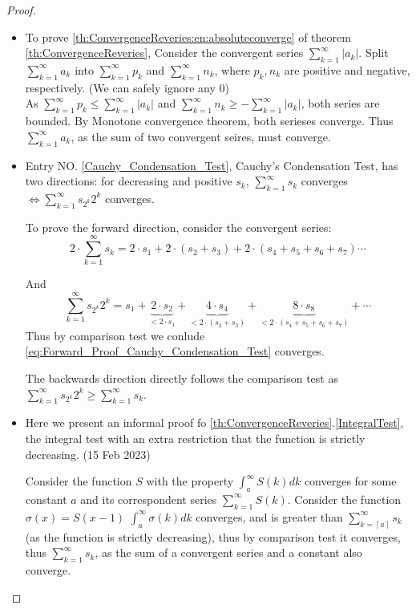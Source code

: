 \documentclass[../note.tex]{subfiles}
\begin{document}
\begin{proof}

\begin{itemize}
	\item 
	To prove \ref{th:ConvergenceReveries:en:absoluteconverge} of theorem \ref{th:ConvergenceReveries},
	Consider the convergent series $\sum^{\infty}_{k=1}|a_k|$.
	Split $\sum^{\infty}_{k=1}a_k$ into $\sum^{\infty}_{k=1}p_k$ and $\sum^{\infty}_{k=1}n_k$, where $p_k, n_k$ are positive and negative, respectively. (We can safely ignore any 0)\\
	As $\sum^{\infty}_{k=1}p_k \leq \sum^{\infty}_{k=1}|a_k| $ and $\sum^{\infty}_{k=1}n_k \geq -\sum^{\infty}_{k=1}|a_k|$, both series are bounded. By Monotone convergence theorem, both serieses converge.
	Thus $\sum^{\infty}_{k=1}a_k$, as the sum of two convergent seires, must converge.

	\item
	Entry NO. \ref{Cauchy_Condensation_Test}, Cauchy's Condensation Test, has two directions: for decreasing and positive $s_k$, $\sum^{\infty}_{k=1}s_k$ converges $\iff \sum^{\infty}_{k=1}s_{2^k}2^k$ converges.

	To prove the forward direction, consider the convergent series:
	\[
		2\cdot \sum^{\infty}_{k=1}s_k =
		2\cdot s_1 + 2 \cdot (s_2+s_3) + 2 \cdot (s_4+s_5+s_6+s_7) \cdots
	\]

	And 
	\begin{equation} \label{eq:Forward_Proof_Cauchy_Condensation_Test}
		\sum^{\infty}_{k=1}s_{2^k}2^k = s_1+\underbrace{2\cdot s_2}_{<2\cdot s_1}
		+ \underbrace{4\cdot s_4}_{<2\cdot (s_2+s_3)}
		+ \underbrace{8\cdot s_8}_{<2\cdot (s_4+s_5+s_6+s_7)} + \cdots
	\end{equation}
	Thus by comparison test we conlude \eqref{eq:Forward_Proof_Cauchy_Condensation_Test} converges. 
	
	The backwards direction directly follows the comparison test as\\ $ \sum^{\infty}_{k=1}s_{2^k}2^k \geq \sum^{\infty}_{k=1}s_k$.
	\item 
		Here we present an informal proof fo \ref{th:ConvergenceReveries}.\ref{IntegralTest}, the integral test with an extra restriction that the function is strictly decreasing. (15 Feb 2023)

		Consider the function $S$ with the property $\int_{a}^{\infty}S(k)dk$ converges for some constant $a$ and its correspondent series 
		$\sum^{\infty}_{k=1}S(k)$. 
		Consider the function $\sigma (x) = S(x-1)$ $\int_{a}^{\infty}\sigma(k)dk$ converges, and is greater than $\sum^{\infty}_{k=\left\lceil{a}\right\rceil}s_k$(as the function is strictly decreasing), thus by comparison test it converges,
		thus $\sum^{\infty}_{k=1}s_k$, as the sum of a convergent series and a constant also converge.
\end{itemize}
\end{proof}
\end{document}
